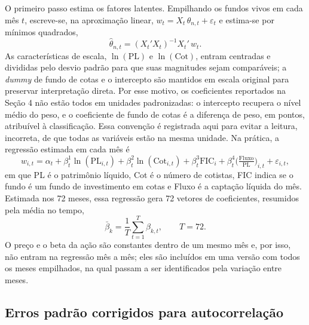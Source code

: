 \documentclass[12pt,a4paper]{article}
\begin{document}
O primeiro passo estima os fatores latentes. Empilhando os fundos vivos em cada mês $t$,
escreve-se, na aproximação linear, $w_t = X_t\,\theta_{n,t} + \varepsilon_t$ e estima-se por
mínimos quadrados,
\begin{equation}
\widehat{\theta}_{n,t} = (X_t'X_t)^{-1}X_t'\,w_t.
\label{eq:ols}
\end{equation}
As características de escala, $\ln(\text{PL})$ e $\ln(\text{Cot})$, entram centradas e divididas
pelo desvio padrão para que suas magnitudes sejam comparáveis; a \emph{dummy} de fundo de cotas
e o intercepto são mantidos em escala original para preservar interpretação direta. Por esse
motivo, os coeficientes reportados na Seção 4 não estão todos em unidades padronizadas: o
intercepto recupera o nível médio do peso, e o coeficiente de fundo de cotas é a diferença de
peso, em pontos, atribuível à classificação. Essa convenção é registrada aqui para evitar a
leitura, incorreta, de que todas as variáveis estão na mesma unidade. Na prática, a regressão
estimada em cada mês é
\begin{equation}
w_{i,t} = \alpha_t + \beta^{1}_t \ln(\text{PL}_{i,t}) + \beta^{2}_t \ln(\text{Cot}_{i,t})
        + \beta^{3}_t \text{FIC}_i + \beta^{4}_t \Big(\tfrac{\text{Fluxo}}{\text{PL}}\Big)_{i,t}
        + \varepsilon_{i,t},
\label{eq:cs}
\end{equation}
em que PL é o patrimônio líquido, Cot é o número de cotistas, FIC indica se o fundo é um fundo
de investimento em cotas e Fluxo é a captação líquida do mês. Estimada nos 72 meses, essa
regressão gera 72 vetores de coeficientes, resumidos pela média no tempo,
\begin{equation}
\bar{\beta}_k = \frac{1}{T}\sum_{t=1}^{T}\beta_{k,t}, \qquad T=72.
\label{eq:fm}
\end{equation}
O preço e o beta da ação são constantes dentro de um mesmo mês e, por isso, não entram na
regressão mês a mês; eles são incluídos em uma versão com todos os meses empilhados, na qual
passam a ser identificados pela variação entre meses.

\subsection{Erros padrão corrigidos para autocorrelação}
\label{sec:nw}
\end{document}
